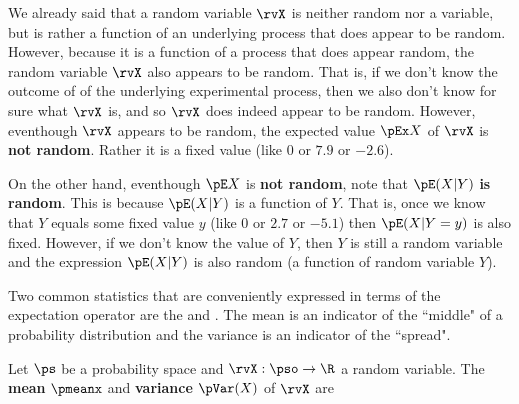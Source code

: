 We already said that a random variable $\rvX$ is neither random nor a variable,
but is rather a function of an underlying process that does appear to be random.
However, because it is a function of a process that does appear random,
the random variable $\rvX$ also appears to be random.
That is, if we don't know the outcome of of the underlying experimental
process, then we also don't know for sure what $\rvX$ is, and so $\rvX$ does
indeed appear to be random.
However, eventhough $\rvX$ appears to be random,
the expected value $\pEx X$  of $\rvX$ is {\bf not random}.
Rather it is a fixed value (like $0$ or $7.9$ or $-2.6$).

On the other hand, eventhough $\pE X$ is {\bf not random},
note that $\pE(X|Y)$ {\bf is random}.
This is because $\pE(X|Y)$ is a function of $Y$.
That is, once we know that $Y$ equals some fixed value $y$
(like $0$ or $2.7$ or $-5.1$) then $\pE(X|Y=y)$ is also fixed.
However, if we don't know the value of $Y$,
then $Y$ is still a random variable and the expression $\pE(X|Y)$
is also random (a function of random variable $Y$).

Two common statistics that are conveniently expressed in terms of the
expectation operator are the  and .
The mean is an indicator of the ``middle" of a probability distribution and the
variance is an indicator of the ``spread".
\begin{definition}
\label{def:Mx}
Let $\ps$ be a probability space and $\rvX:\pso\to\R$ a random variable.
The {\bf mean} $\pmeanx$ and {\bf variance} $\pVar(X)$ of $\rvX$ are
\end{definition}

